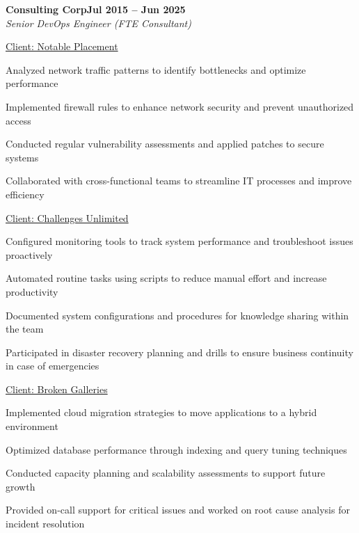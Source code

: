 \documentclass[letterpaper,10pt]{article}
\newcommand{\heading}[2]{
  \hspace{10pt}#1\hfill#2\\
}
\newcommand{\headingBf}[2]{
  \heading{\textbf{#1}}{\textbf{#2}}
}
\newcommand{\headingIt}[2]{
  \heading{\textit{#1}}{\textit{#2}}
}
\newenvironment{resume_list}{
  \vspace{-7pt}
  \begin{itemize}[itemsep=-2px, parsep=1pt, leftmargin=30pt]
}{
  \end{itemize}
}
\newcommand{\itemTitle}[1]{
  \item[] \underline{#1}\vspace{4pt}
}
\begin{document}
  \headingBf{Consulting Corp}{Jul 2015 -- Jun 2025}
  \headingIt{Senior DevOps Engineer (FTE Consultant)}{}
  \begin{resume_list}
    \itemTitle{Client: Notable Placement}
    \item Analyzed network traffic patterns to identify bottlenecks and optimize performance
    \item Implemented firewall rules to enhance network security and prevent unauthorized access
    \item Conducted regular vulnerability assessments and applied patches to secure systems
    \item Collaborated with cross-functional teams to streamline IT processes and improve efficiency
    \vspace{3pt}
    \itemTitle{Client: Challenges Unlimited}
    \item Configured monitoring tools to track system performance and troubleshoot issues proactively
    \item Automated routine tasks using scripts to reduce manual effort and increase productivity
    \item Documented system configurations and procedures for knowledge sharing within the team
    \item Participated in disaster recovery planning and drills to ensure business continuity in case of emergencies
    \vspace{3pt}
    \itemTitle{Client: Broken Galleries}
    \item Implemented cloud migration strategies to move applications to a hybrid environment
    \item Optimized database performance through indexing and query tuning techniques
    \item Conducted capacity planning and scalability assessments to support future growth
    \item Provided on-call support for critical issues and worked on root cause analysis for incident resolution
  \end{resume_list}
\end{document}
